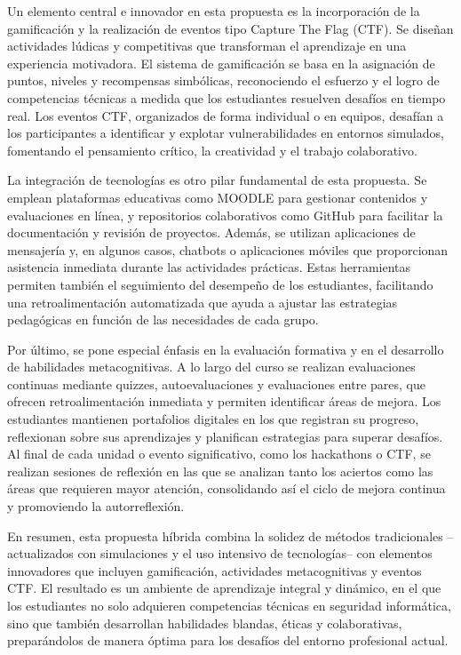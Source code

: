 Un elemento central e innovador en esta propuesta es la incorporación de la gamificación y la realización de eventos tipo Capture The Flag (CTF). Se diseñan actividades lúdicas y competitivas que transforman el aprendizaje en una experiencia motivadora. El sistema de gamificación se basa en la asignación de puntos, niveles y recompensas simbólicas, reconociendo el esfuerzo y el logro de competencias técnicas a medida que los estudiantes resuelven desafíos en tiempo real. Los eventos CTF, organizados de forma individual o en equipos, desafían a los participantes a identificar y explotar vulnerabilidades en entornos simulados, fomentando el pensamiento crítico, la creatividad y el trabajo colaborativo.

La integración de tecnologías es otro pilar fundamental de esta propuesta. Se emplean plataformas educativas como MOODLE para gestionar contenidos y evaluaciones en línea, y repositorios colaborativos como GitHub para facilitar la documentación y revisión de proyectos. Además, se utilizan aplicaciones de mensajería y, en algunos casos, chatbots o aplicaciones móviles que proporcionan asistencia inmediata durante las actividades prácticas. Estas herramientas permiten también el seguimiento del desempeño de los estudiantes, facilitando una retroalimentación automatizada que ayuda a ajustar las estrategias pedagógicas en función de las necesidades de cada grupo.

Por último, se pone especial énfasis en la evaluación formativa y en el desarrollo de habilidades metacognitivas. A lo largo del curso se realizan evaluaciones continuas mediante quizzes, autoevaluaciones y evaluaciones entre pares, que ofrecen retroalimentación inmediata y permiten identificar áreas de mejora. Los estudiantes mantienen portafolios digitales en los que registran su progreso, reflexionan sobre sus aprendizajes y planifican estrategias para superar desafíos. Al final de cada unidad o evento significativo, como los hackathons o CTF, se realizan sesiones de reflexión en las que se analizan tanto los aciertos como las áreas que requieren mayor atención, consolidando así el ciclo de mejora continua y promoviendo la autorreflexión.

En resumen, esta propuesta híbrida combina la solidez de métodos tradicionales –actualizados con simulaciones y el uso intensivo de tecnologías– con elementos innovadores que incluyen gamificación, actividades metacognitivas y eventos CTF. El resultado es un ambiente de aprendizaje integral y dinámico, en el que los estudiantes no solo adquieren competencias técnicas en seguridad informática, sino que también desarrollan habilidades blandas, éticas y colaborativas, preparándolos de manera óptima para los desafíos del entorno profesional actual.